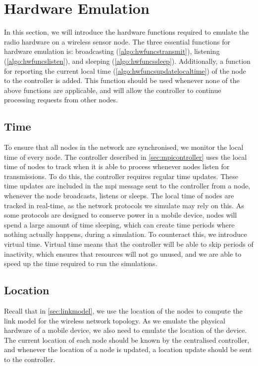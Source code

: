 \section{Hardware Emulation}\label{sec:mpiprotocol}
In this section, we will introduce the hardware functions required to emulate the radio hardware on a wireless sensor node. The three essential functions for hardware emulation is: broadcasting (\autoref{algo:hwfuncstransmit}), listening (\autoref{algo:hwfuncslisten}), and sleeping (\autoref{algo:hwfuncssleep}). Additionally, a function for reporting the current local time (\autoref{algo:hwfuncsupdatelocaltime}) of the node to the controller is added. This function should be used whenever none of the above functions are applicable, and will allow the controller to continue processing requests from other nodes.

\subsection{Time}\label{sec:mpi:time}
To ensure that all nodes in the network are synchronised, we monitor the local time of every node. The controller described in \autoref{sec:mpicontroller} uses the local time of nodes to track when it is able to process whenever nodes listen for transmissions. To do this, the controller requires regular time updates. These time updates are included in the \acrshort{mpi} message sent to the controller from a node, whenever the node broadcasts, listens or sleeps. The local time of nodes are tracked in real-time, as the network protocols we simulate may rely on this. \smallbreak
As some protocols are designed to conserve power in a mobile device, nodes will spend a large amount of time sleeping, which can create time periods where nothing actually happens, during a simulation. To counteract this, we introduce virtual time. Virtual time means that the controller will be able to skip periods of inactivity, which ensures that resources will not go unused, and we are able to speed up the time required to run the simulations.

\subsection{Location}\label{sec:mpinodelocation} %
Recall that in \autoref{sec:linkmodel}, we use the location of the nodes to compute the link model for the wireless network topology. As we emulate the physical hardware of a mobile device, we also need to emulate the location of the device. The current location of each node should be known by the centralised controller, and whenever the location of a node is updated, a location update should be sent to the controller.

